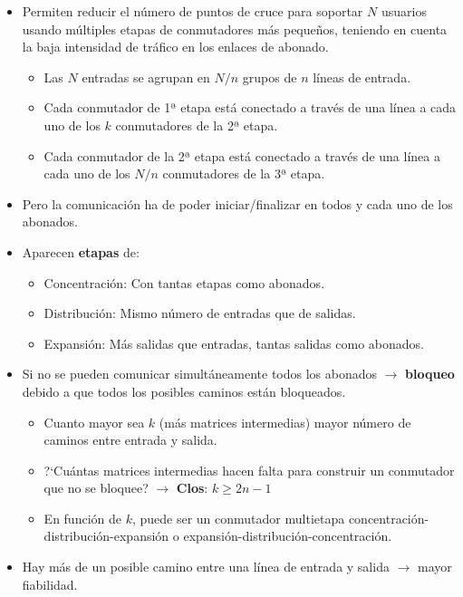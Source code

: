 \documentclass[10pt,portrait, twocolumn]{article}
\begin{document}
\begin{itemize}
\item Permiten reducir el número de puntos de cruce para soportar $N$ usuarios usando múltiples etapas de conmutadores más pequeños, teniendo en cuenta la baja intensidad de tráfico en los enlaces de abonado. 
	\begin{itemize}
	\item Las $N$ entradas se agrupan en $N/n$ grupos de $n$ líneas de entrada.
	\item Cada conmutador de 1ª etapa está conectado a través de una línea a cada uno de los $k$ conmutadores de la 2ª etapa.
	\item Cada conmutador de la 2ª etapa está conectado a través de una línea a cada uno de los $N/n$ conmutadores de la 3ª etapa.
	\end{itemize}
\item Pero la comunicación ha de poder iniciar/finalizar en todos y cada uno de los abonados.
\item Aparecen \textbf{etapas} de:

	\begin{itemize}
		\item Concentración: Con tantas etapas como abonados.
		\item Distribución: Mismo número de entradas que de salidas.
		\item Expansión: Más salidas que entradas, tantas salidas como abonados.
	\end{itemize}
\item Si no se pueden comunicar simultáneamente todos los abonados $\rightarrow$ \textbf{bloqueo} debido a que todos los posibles caminos están bloqueados.
	\begin{itemize}
	\item Cuanto mayor sea $k$ (más matrices intermedias) mayor número de caminos entre entrada y salida.
	\item ?`Cuántas matrices intermedias hacen falta para construir un conmutador que no se bloquee? $\rightarrow$ \textbf{Clos}: $k \geq 2n - 1$
	\item En función de $k$, puede ser un conmutador multietapa concentración-distribución-expansión o expansión-distribución-concentración.
	\end{itemize}
\item Hay más de un posible camino entre una línea de entrada y salida $\rightarrow$ mayor fiabilidad.
\end{itemize}
\end{document}
